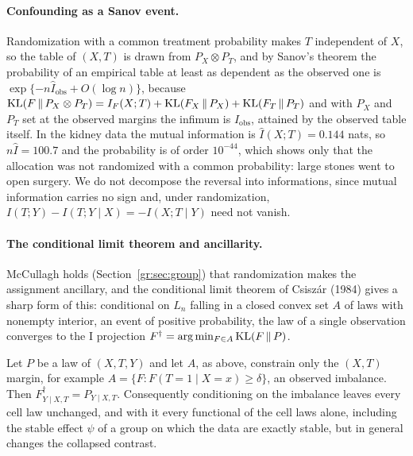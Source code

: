 \paragraph{Confounding as a Sanov event.}
Randomization with a common treatment probability makes $T$ independent of $X$, so the table of $(X,T)$ is drawn from $P_X\otimes P_T$, and by Sanov's theorem the probability of an empirical table at least as dependent as the observed one is $\exp\{-n\hat I_{\mathrm{obs}}+O(\log n)\}$, because $\mathrm{KL}(F\,\|\,P_X\otimes P_T)=I_F(X;T)+\mathrm{KL}(F_X\,\|\,P_X)+\mathrm{KL}(F_T\,\|\,P_T)$ and with $P_X$ and $P_T$ set at the observed margins the infimum is $\hat I_{\mathrm{obs}}$, attained by the observed table itself. In the kidney data the mutual information is $\hat I(X;T)=0.144$ nats, so $n\hat I=100.7$ and the probability is of order $10^{-44}$, which shows only that the allocation was not randomized with a common probability: large stones went to open surgery. We do not decompose the reversal into informations, since mutual information carries no sign and, under randomization, $I(T;Y)-I(T;Y\mid X)=-I(X;T\mid Y)$ need not vanish.

\paragraph{The conditional limit theorem and ancillarity.}
McCullagh holds (Section~\ref{gr:sec:group}) that randomization makes the assignment ancillary, and the conditional limit theorem of Csisz\'ar (1984) gives a sharp form of this: conditional on $L_n$ falling in a closed convex set $A$ of laws with nonempty interior, an event of positive probability, the law of a single observation converges to the I projection $F^{\dagger}=\arg\min_{F\in A}\mathrm{KL}(F\,\|\,P)$.

\begin{proposition}\label{gr:prop:ancillary}
Let $P$ be a law of $(X,T,Y)$ and let $A$, as above, constrain only the $(X,T)$ margin, for example $A=\{F:F(T=1\mid X=x)\ge\delta\}$, an observed imbalance. Then $F^{\dagger}_{Y\mid X,T}=P_{Y\mid X,T}$. Consequently conditioning on the imbalance leaves every cell law unchanged, and with it every functional of the cell laws alone, including the stable effect $\psi$ of a group on which the data are exactly stable, but in general changes the collapsed contrast.
\end{proposition}

